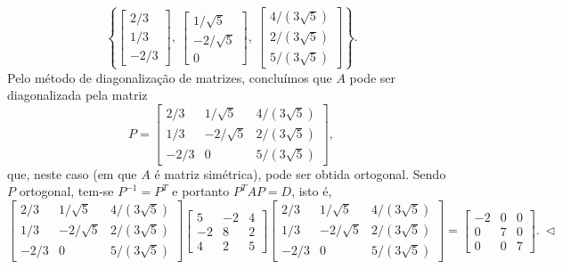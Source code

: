 \begin{ex}
	\begin{equation}
	\left\lbrace
	\begin{bmatrix}
	2/3 \\ 1/3 \\ -2/3
	\end{bmatrix}, \
	\begin{bmatrix}
	1/\sqrt{5} \\ -2/\sqrt{5} \\ 0
	\end{bmatrix}, \
	\begin{bmatrix}
	4/(3\sqrt{5}) \\ 2/(3\sqrt{5}) \\ 5/(3\sqrt{5})
	\end{bmatrix}
	\right\rbrace.
	\end{equation} Pelo método de diagonalização de matrizes, concluímos que $A$ pode ser diagonalizada pela matriz
	\begin{equation}
	P =
	\begin{bmatrix}
	2/3  & 1/\sqrt{5}  & 4/(3\sqrt{5}) \\
	1/3  & -2/\sqrt{5} & 2/(3\sqrt{5}) \\
	-2/3 &       0     & 5/(3\sqrt{5})
	\end{bmatrix},
	\end{equation} que, neste caso (em que $A$ é matriz simétrica), pode ser obtida ortogonal. Sendo $P$ ortogonal, tem-se $P^{-1} = P^T$ e portanto $P^{T} A P =  D$, isto é,
	\begin{equation}
	\begin{bmatrix}
	2/3  & 1/\sqrt{5}  & 4/(3\sqrt{5}) \\
	1/3  & -2/\sqrt{5} & 2/(3\sqrt{5}) \\
	-2/3 &       0     & 5/(3\sqrt{5})
	\end{bmatrix}
	\begin{bmatrix}
	5 & -2 & 4 \\
	-2 & 8 & 2 \\
	4 & 2 & 5
	\end{bmatrix}
	\begin{bmatrix}
	2/3  & 1/\sqrt{5}  & 4/(3\sqrt{5}) \\
	1/3  & -2/\sqrt{5} & 2/(3\sqrt{5}) \\
	-2/3 &       0     & 5/(3\sqrt{5})
	\end{bmatrix} =
	\begin{bmatrix}
	-2& 0 & 0 \\
	0 & 7 & 0 \\
	0 & 0 & 7
	\end{bmatrix}. \ \lhd
	\end{equation}
\end{ex}


